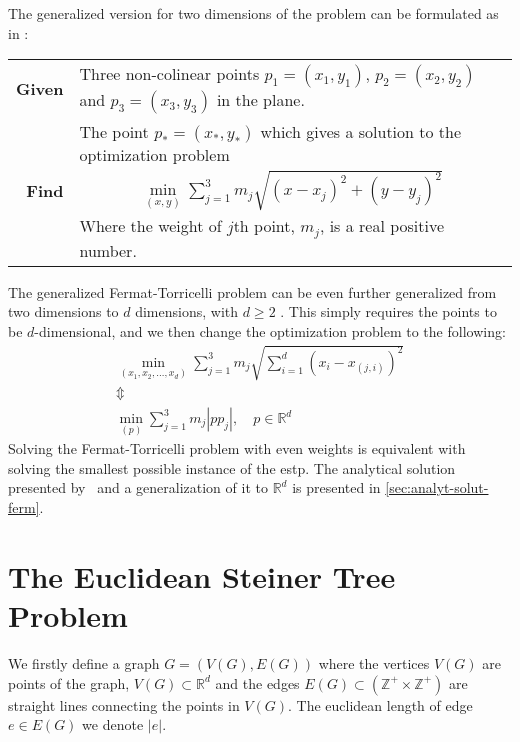 The generalized version for two dimensions of the problem can be formulated as in
\textcite{uteshev2014}:
%
\begin{center}
  \begin{tabular}{rp{9cm}}
    \toprule
    \textbf{Given} & Three non-colinear points $p_1 = (x_1, y_1)$, $p_2 = (x_2,
                     y_2)$ and $p_3 = (x_3, y_3)$ in the plane. \\
    \textbf{Find} & The point $p_\ast = (x_\ast, y_\ast)$ which gives a solution
                    to the optimization problem
                    \begin{gather}
                      \min_{(x,y)} \sum_{j=1}^3 m_j \sqrt{{(x-x_j)}^2 + {(y-y_j)}^2}
                    \end{gather}
    Where the weight of $j$th point, $m_j$, is a real positive number. \\
    \bottomrule
  \end{tabular}
\end{center}
%
The generalized Fermat-Torricelli problem can be even further generalized from
two dimensions to $d$ dimensions, with $d \ge 2$
\cite{fermattorricelliproblem}. This simply requires the points to be
$d$-dimensional, and we then change the optimization problem to the following:
%
\begin{gather}
  \min_{(x_1, x_2, \ldots, x_d)} \sum_{j=1}^3 m_j
  \sqrt{\sum_{i=1}^d {(x_i - x_{(j,i)})}^2 }
  \\ \Updownarrow \\
  \label{eq:4}
  \min_{(p)} \sum_{j=1}^3 m_j | p p_j |, \quad p \in \mathbb{R}^d
\end{gather}
%
Solving the Fermat-Torricelli problem with even weights is equivalent with solving
the smallest possible instance of the \acl{estp}. The analytical solution
presented by~\textcite{uteshev2014} and a generalization of it to $\mathbb{R}^d$ is
presented in \cref{sec:analyt-solut-ferm}.

\section{The Euclidean Steiner Tree Problem}
\label{sec:eucl-stein-tree}

We firstly define a graph $G = (V(G), E(G))$ where the vertices $V(G)$ are
points of the graph, $V(G) \subset \mathbb{R}^d$ and the edges
$E(G) \subset (\mathbb{Z}^{+} \times \mathbb{Z}^{+})$ are straight lines
connecting the points in $V(G)$. The euclidean length of edge $e \in E(G)$ we
denote $|e|$.

